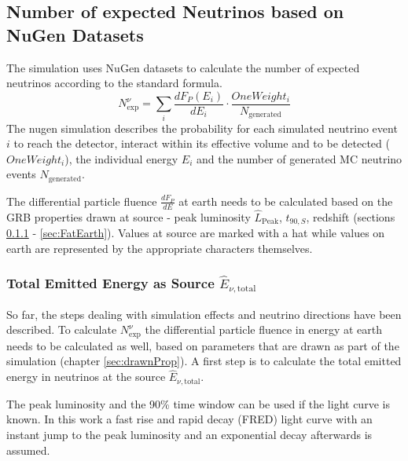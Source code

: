 \subsection{Number of expected Neutrinos based on NuGen Datasets}
The simulation uses NuGen datasets to calculate the number of expected
neutrinos according to the standard formula.
\begin{equation}
\label{eq:Nexp_general}
 N_\text{exp}^\nu = \sum_i\frac{dF_P(E_i)}{dE_i} \cdot
\frac{OneWeight_i}{N_\text{generated}}
\end{equation}
The nugen simulation describes the probability for each simulated neutrino event
$i$ to reach the detector,
interact within its effective volume and to be detected ($OneWeight_i$), the
individual energy $E_i$ and the number of generated MC neutrino events
$N_\text{generated}$.

The differential particle fluence $\frac{dF_P}{dE}$ at earth needs to be
calculated based on the GRB properties drawn at source - peak luminosity
$\hat{L}_\text{Peak}$, $\hat{t}_{90, S}$, redshift (sections \ref{sec:Etotal} -
\ref{sec:FatEarth}). Values at source are marked with a
hat while values on earth are represented by the appropriate characters 
themselves.








\subsubsection{Total Emitted Energy as Source $\hat{E}_{\nu, \text{total}}$}
\label{sec:Etotal}
So far, the steps dealing with simulation effects and neutrino directions have
been described. To calculate $N_\text{exp}^\nu$ the differential particle
fluence in energy at earth needs to be calculated as well, based on parameters
that are drawn as part of the simulation (chapter \ref{sec:drawnProp}). A first
step is to calculate the total emitted energy in neutrinos at the source
$\hat{E}_{\nu, \text{total}}$.

The peak luminosity and the 90\% time window can be used if the light curve is
known. In
this work a fast rise and rapid decay (FRED) light curve with an instant jump
to the peak luminosity and an exponential decay afterwards is assumed. 


